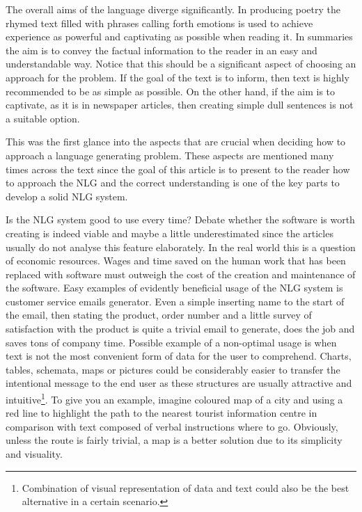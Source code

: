 The overall aims of the language diverge significantly. In producing poetry the rhymed text filled with phrases calling forth emotions is used to achieve experience as powerful and captivating as possible when reading it. In summaries the aim is to convey the factual information to the reader in an easy and understandable way. Notice that this should be a significant aspect of choosing an approach for the problem. If the goal of the text is to inform, then text is highly recommended to be as simple as possible. On the other hand, if the aim is to captivate, as it is in newspaper articles, then creating simple dull sentences is not a suitable option. 

This was the first glance into the aspects that are crucial when deciding how to approach a language generating problem. These aspects are mentioned many times across the text since the goal of this article is to present to the reader how to approach the NLG and the correct understanding is one of the key parts to develop a solid NLG system.

Is the NLG system good to use every time? Debate whether the software is worth creating is indeed viable and maybe a little underestimated since the articles usually do not analyse this feature elaborately. In the real world this is a question of economic resources. Wages and time saved on the human work that has been replaced with software must outweigh the cost of the creation and maintenance of the software. Easy examples of evidently beneficial usage of the NLG system is customer service emails generator. Even a simple inserting name to the start of the email, then stating the product, order number and a little survey of satisfaction with the product is quite a trivial email to generate, does the job and saves tons of company time. Possible example of a non-optimal usage is when text is not the most convenient form of data for the user to comprehend. Charts, tables, schemata, maps or pictures could be considerably easier to transfer the intentional message to the end user as these structures are usually attractive and intuitive\footnote{Combination of visual representation of data and text could also be the best alternative in a certain scenario.}. To give you an example, imagine coloured map of a city and using a red line to highlight the path to the nearest tourist information centre in comparison with text composed of verbal instructions where to go. Obviously, unless the route is fairly trivial, a map is a better solution due to its simplicity and visuality. 

